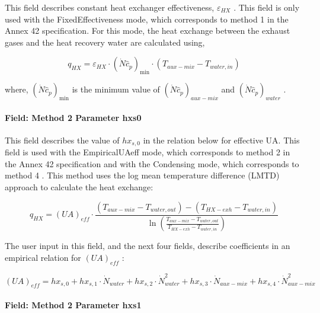 This field describes constant heat exchanger effectiveness, \({\varepsilon_{HX}}\) . This field is only used with the FixedEffectiveness mode, which corresponds to method 1 in the Annex 42 specification. For this mode, the heat exchange between the exhaust gases and the heat recovery water are calculated using,

\begin{equation}
{q_{HX}} = {\varepsilon_{HX}} \cdot {\left( {\dot N{{\hat c}_p}} \right)_{\min }} \cdot \left( {{T_{aux - mix}} - {T_{water,in}}} \right)
\end{equation}

where, \({\left( {\dot N{{\hat c}_p}} \right)_{\min }}\) is the minimum value of \({\left( {\dot N{{\hat c}_p}} \right)_{aux - mix}}\) and \({\left( {\dot N{{\hat c}_p}} \right)_{water}}\) .

\paragraph{Field: Method 2 Parameter hxs0}\label{field-method-2-parameter-hxs0}

This field describes the value of \(h{x_{s,0}}\) in the relation below for effective UA. This field is used with the EmpiricalUAeff mode, which corresponds to method 2 in the Annex 42 specification and with the Condensing mode, which corresponds to method 4 . This method uses the log mean temperature difference (LMTD) approach to calculate the heat exchange:

\begin{equation}
{q_{HX}} = {\left( {UA} \right)_{eff}} \cdot \frac{{\left( {{T_{aux - mix}} - {T_{water,out}}} \right) - \left( {{T_{HX - exh}} - {T_{water,in}}} \right)}}{{\ln \left( {\frac{{{T_{aux - mix}} - {T_{water,out}}}}{{{T_{HX - exh}} - {T_{water,in}}}}} \right)}}
\end{equation}

The user input in this field, and the next four fields, describe coefficients in an empirical relation for \({\left( {UA} \right)_{eff}}\) :

\begin{equation}
{\left( {UA} \right)_{eff}} = h{x_{s,0}} + h{x_{s,1}} \cdot {\dot N_{water}} + h{x_{s,2}} \cdot \dot N_{water}^2 + h{x_{s,3}} \cdot {\dot N_{aux - mix}} + h{x_{s,4}} \cdot \dot N_{aux - mix}^2
\end{equation}

\paragraph{Field: Method 2 Parameter hxs1}\label{field-method-2-parameter-hxs1}

